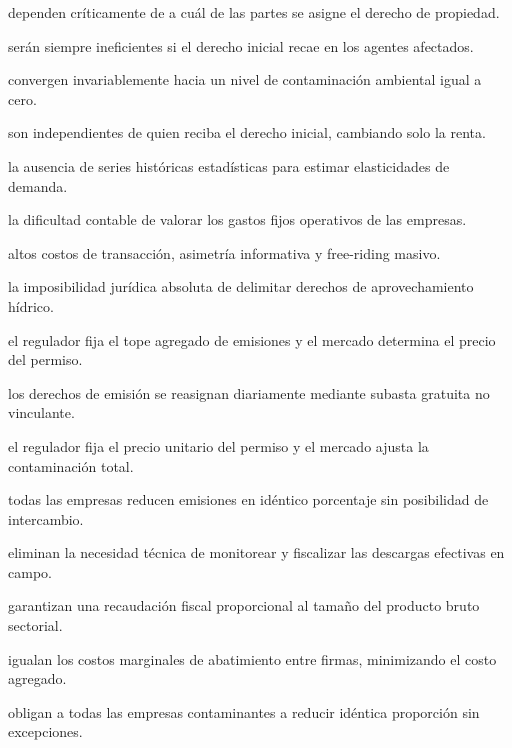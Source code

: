 \begin{opts}
    \item dependen críticamente de a cuál de las partes se asigne el derecho de propiedad.
    \item serán siempre ineficientes si el derecho inicial recae en los agentes afectados.
    \item convergen invariablemente hacia un nivel de contaminación ambiental igual a cero.
    \item son independientes de quien reciba el derecho inicial, cambiando solo la renta.
\end{opts}

\begin{opts}
    \item la ausencia de series históricas estadísticas para estimar elasticidades de demanda.
    \item la dificultad contable de valorar los gastos fijos operativos de las empresas.
    \item altos costos de transacción, asimetría informativa y free-riding masivo.
    \item la imposibilidad jurídica absoluta de delimitar derechos de aprovechamiento hídrico.
\end{opts}

\begin{opts}
    \item el regulador fija el tope agregado de emisiones y el mercado determina el precio del permiso.
    \item los derechos de emisión se reasignan diariamente mediante subasta gratuita no vinculante.
    \item el regulador fija el precio unitario del permiso y el mercado ajusta la contaminación total.
    \item todas las empresas reducen emisiones en idéntico porcentaje sin posibilidad de intercambio.
\end{opts}

\begin{opts}
    \item eliminan la necesidad técnica de monitorear y fiscalizar las descargas efectivas en campo.
    \item garantizan una recaudación fiscal proporcional al tamaño del producto bruto sectorial.
    \item igualan los costos marginales de abatimiento entre firmas, minimizando el costo agregado.
    \item obligan a todas las empresas contaminantes a reducir idéntica proporción sin excepciones.
\end{opts}

